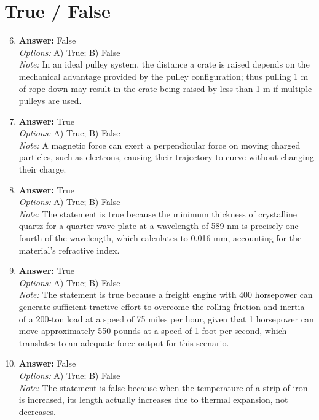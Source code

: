 \documentclass[12pt]{article}
\begin{document}
\section*{True / False}
\begin{enumerate}[label=\arabic*.]
\setcounter{enumi}{5}
\item \textbf{Answer:} False
\\ \textit{Options:} A) True; B) False
\\ \textit{Note:} In an ideal pulley system, the distance a crate is raised depends on the mechanical advantage provided by the pulley configuration; thus pulling 1 m of rope down may result in the crate being raised by less than 1 m if multiple pulleys are used.
\item \textbf{Answer:} True
\\ \textit{Options:} A) True; B) False
\\ \textit{Note:} A magnetic force can exert a perpendicular force on moving charged particles, such as electrons, causing their trajectory to curve without changing their charge.
\item \textbf{Answer:} True
\\ \textit{Options:} A) True; B) False
\\ \textit{Note:} The statement is true because the minimum thickness of crystalline quartz for a quarter wave plate at a wavelength of 589 nm is precisely one-fourth of the wavelength, which calculates to 0.016 mm, accounting for the material's refractive index.
\item \textbf{Answer:} True
\\ \textit{Options:} A) True; B) False
\\ \textit{Note:} The statement is true because a freight engine with 400 horsepower can generate sufficient tractive effort to overcome the rolling friction and inertia of a 200-ton load at a speed of 75 miles per hour, given that 1 horsepower can move approximately 550 pounds at a speed of 1 foot per second, which translates to an adequate force output for this scenario.
\item \textbf{Answer:} False
\\ \textit{Options:} A) True; B) False
\\ \textit{Note:} The statement is false because when the temperature of a strip of iron is increased, its length actually increases due to thermal expansion, not decreases.
\end{enumerate}
\end{document}
